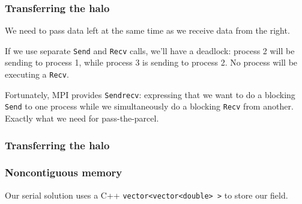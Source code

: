 \subsubsection{Transferring the halo}\label{transferring-the-halo}

We need to pass data left at the same time as we receive data from the
right.

If we use separate \texttt{Send} and \texttt{Recv} calls, we'll have a
deadlock: process 2 will be sending to process 1, while process 3 is
sending to process 2. No process will be executing a \texttt{Recv}.

Fortunately, MPI provides \texttt{Sendrecv}: expressing that we want to
do a blocking \texttt{Send} to one process while we simultaneously do a
blocking \texttt{Recv} from another. Exactly what we need for
pass-the-parcel.

\subsubsection{Transferring the halo}\label{transferring-the-halo-1}

\begin{Shaded}
\begin{Highlighting}[]

 
\NormalTok{\}}
\end{Highlighting}
\end{Shaded}

\subsubsection{Noncontiguous memory}\label{noncontiguous-memory}

Our serial solution uses a C++
\texttt{vector\textless{}vector\textless{}double\textgreater{} \textgreater{}}
to store our field.

